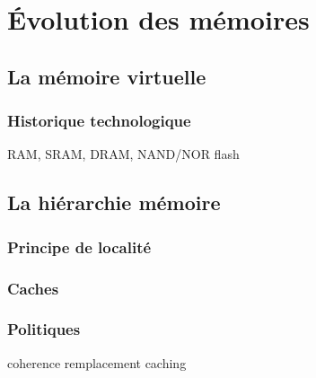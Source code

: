 \section{Évolution des mémoires}

\subsection{La mémoire virtuelle}
\label{sub_virtual_mem}

\subsubsection{Historique technologique}
RAM, SRAM, DRAM, NAND/NOR flash

\subsection{La hiérarchie mémoire}
\subsubsection{Principe de localité}

\subsubsection{Caches}
\subsubsection{Politiques}
coherence
remplacement
caching







